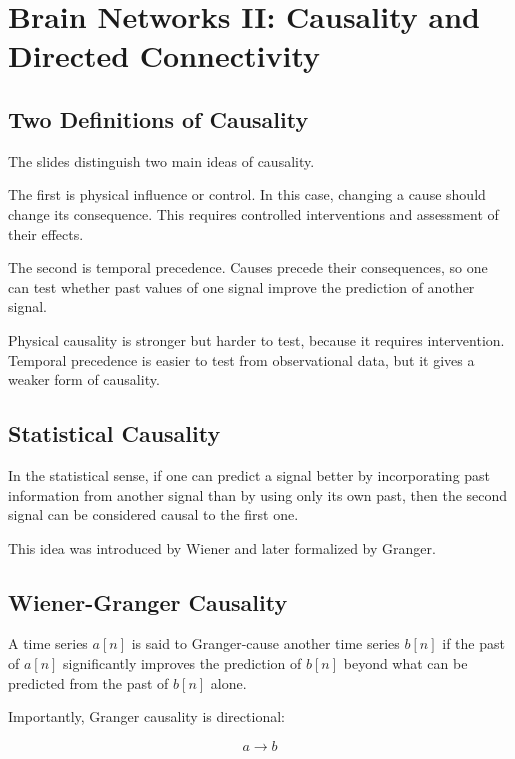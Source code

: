 \section{Brain Networks II: Causality and Directed Connectivity}

\subsection{Two Definitions of Causality}

The slides distinguish two main ideas of causality.

The first is physical influence or control. In this case, changing a cause should change its consequence. This requires controlled interventions and assessment of their effects.

The second is temporal precedence. Causes precede their consequences, so one can test whether past values of one signal improve the prediction of another signal.

\begin{authornote}
Physical causality is stronger but harder to test, because it requires intervention. Temporal precedence is easier to test from observational data, but it gives a weaker form of causality.
\end{authornote}

\subsection{Statistical Causality}

In the statistical sense, if one can predict a signal better by incorporating past information from another signal than by using only its own past, then the second signal can be considered causal to the first one.

This idea was introduced by Wiener and later formalized by Granger.

\subsection{Wiener-Granger Causality}

A time series $a[n]$ is said to Granger-cause another time series $b[n]$ if the past of $a[n]$ significantly improves the prediction of $b[n]$ beyond what can be predicted from the past of $b[n]$ alone.

Importantly, Granger causality is directional:

\[
a \rightarrow b
\]


